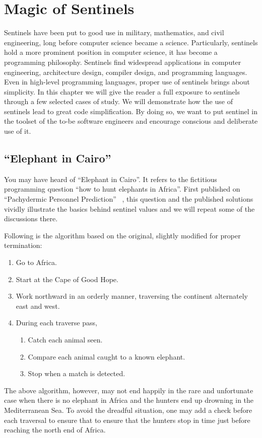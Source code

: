 \documentclass[oneside,11pt]{book}
\theoremstyle{definition}
\theoremstyle{remark}
\begin{document}
\chapter{Magic of Sentinels} \label{ch:sentinels}
Sentinels have been put to good use in military, mathematics, and civil engineering, long before
computer science became a science.
Particularly, sentinels hold a more prominent position in computer science,
it has become a programming philosophy.
Sentinels find widespread applications in computer engineering, architecture design,
compiler design, and programming languages.
Even in high-level programming languages, proper use of sentinels brings about
simplicity.
In this chapter we will give the reader a full exposure to sentinels through a few selected cases
of study.
We will demonstrate how the use of sentinels lead to great code simplification.
By doing so, we want to put sentinel in the toolset of the to-be software engineers and encourage
conscious and deliberate use of it.


\section{``Elephant in Cairo''}\label{sec:elephant-in-cairo}

You may have heard of ``Elephant in Cairo''.
It refers to the fictitious programming question ``how to hunt elephants in Africa''.
First published on ``Pachydermic Personnel Prediction'' ~\cite{elephant-in-Cairo:1989},
this question and the published solutions vividly illustrate the basics
behind sentinel values and we will repeat some of the discussions there.


Following is the algorithm based on the original, slightly modified for proper termination:
\begin{alisting}[H]
    \caption{\label{enum:elephant-hunt-algo-A}
    Algorithm for solving the `Elephant in Cairo' question.}
    \begin{enumerate}
        \item Go to Africa.
        \item Start at the Cape of Good Hope.
        \item Work northward in an orderly manner, traversing the continent alternately east and west.
        \item During each traverse pass,
        \begin{enumerate}
            \item Catch each animal seen.
            \item Compare each animal caught to a known elephant.
            \item Stop when a match is detected.
        \end{enumerate}
    \end{enumerate}
\end{alisting}
The above algorithm, however, may not end happily in the rare and
unfortunate case when there is no elephant in Africa and the hunters end up drowning in the
Mediterranean Sea.
To avoid the dreadful situation, one may add a check before each traversal to ensure
that to ensure that the hunters stop in time just before reaching the north end of Africa.
\end{document}
